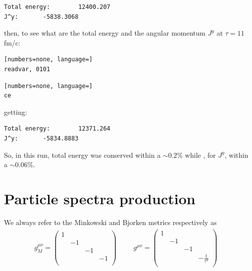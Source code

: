 \begin{verbatim}
Total energy:        12400.207
J^y:       -5838.3068
\end{verbatim}
then, to see what are the total energy and the angular momentum $J^y$ at $\tau=11$ fm/c:
\begin{lstlisting}[numbers=none, language=]
readvar, 0101
\end{lstlisting}
\begin{lstlisting}[numbers=none, language=]
ce
\end{lstlisting}
getting:
\begin{verbatim}
Total energy:        12371.264
J^y:       -5834.8883
\end{verbatim}
So, in this run, total energy was conserved within a $\sim 0.2\%$ while , for $J^y$, within a $\sim 0.06\%$.\\


\chapter{Particle spectra production}\label{spectrachap}
We always refer to the Minkowski and Bjorken metrics 
respectively as
   \begin{align}
    &g_{M}^{\mu\nu}=\left( \begin{array}{cccc}
                        1&&&\\
                        &-1&&\\
                        &&-1&\\
                        &&&-1\\
                       \end{array}\right)&&
    &g^{\mu\nu}=\left( \begin{array}{cccc}
                        1&&&\\
                        &-1&&\\
                        &&-1&\\
                        &&&-\frac{1}{\tau^2}\\
                       \end{array}\right)&&
   \end{align}

